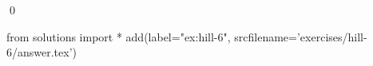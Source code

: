 
\begin{ex} 
  \label{ex:hill-6}
  
  \qed
\end{ex} 
\begin{python0}
from solutions import *
add(label="ex:hill-6",
    srcfilename='exercises/hill-6/answer.tex') 
\end{python0}
